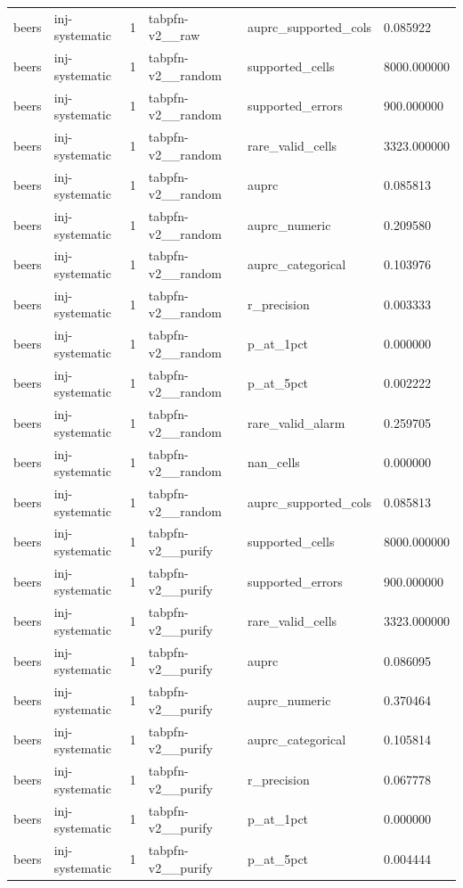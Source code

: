 \begin{tabular}{llllll}
beers & inj-systematic & 1 & tabpfn-v2\_\_raw & auprc\_supported\_cols & 0.085922 \\
beers & inj-systematic & 1 & tabpfn-v2\_\_random & supported\_cells & 8000.000000 \\
beers & inj-systematic & 1 & tabpfn-v2\_\_random & supported\_errors & 900.000000 \\
beers & inj-systematic & 1 & tabpfn-v2\_\_random & rare\_valid\_cells & 3323.000000 \\
beers & inj-systematic & 1 & tabpfn-v2\_\_random & auprc & 0.085813 \\
beers & inj-systematic & 1 & tabpfn-v2\_\_random & auprc\_numeric & 0.209580 \\
beers & inj-systematic & 1 & tabpfn-v2\_\_random & auprc\_categorical & 0.103976 \\
beers & inj-systematic & 1 & tabpfn-v2\_\_random & r\_precision & 0.003333 \\
beers & inj-systematic & 1 & tabpfn-v2\_\_random & p\_at\_1pct & 0.000000 \\
beers & inj-systematic & 1 & tabpfn-v2\_\_random & p\_at\_5pct & 0.002222 \\
beers & inj-systematic & 1 & tabpfn-v2\_\_random & rare\_valid\_alarm & 0.259705 \\
beers & inj-systematic & 1 & tabpfn-v2\_\_random & nan\_cells & 0.000000 \\
beers & inj-systematic & 1 & tabpfn-v2\_\_random & auprc\_supported\_cols & 0.085813 \\
beers & inj-systematic & 1 & tabpfn-v2\_\_purify & supported\_cells & 8000.000000 \\
beers & inj-systematic & 1 & tabpfn-v2\_\_purify & supported\_errors & 900.000000 \\
beers & inj-systematic & 1 & tabpfn-v2\_\_purify & rare\_valid\_cells & 3323.000000 \\
beers & inj-systematic & 1 & tabpfn-v2\_\_purify & auprc & 0.086095 \\
beers & inj-systematic & 1 & tabpfn-v2\_\_purify & auprc\_numeric & 0.370464 \\
beers & inj-systematic & 1 & tabpfn-v2\_\_purify & auprc\_categorical & 0.105814 \\
beers & inj-systematic & 1 & tabpfn-v2\_\_purify & r\_precision & 0.067778 \\
beers & inj-systematic & 1 & tabpfn-v2\_\_purify & p\_at\_1pct & 0.000000 \\
beers & inj-systematic & 1 & tabpfn-v2\_\_purify & p\_at\_5pct & 0.004444 \\

\end{tabular}
